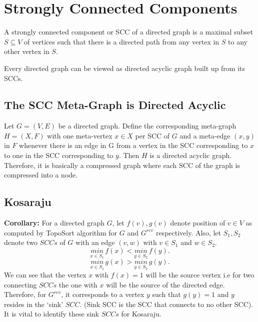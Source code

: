 \documentclass{article}
\begin{document}
	\section{Strongly Connected Components}
	A strongly connected component or SCC of a directed graph is a maximal subset $S \subseteq V$ of vertices such that there is a directed path from any vertex in $S$ to any other vertex in $S$.
	
	Every directed graph can be viewed as directed acyclic graph built up from its SCCs.
	
	\subsection*{The SCC Meta-Graph is Directed Acyclic}
	Let $G = (V,E)$ be a directed graph. Define the corresponding meta-graph $H = (X,F)$ with one meta-vertex  $x \in X$ per SCC of $G$ and a meta-edge $(x,y)$ in $F$ whenever there is an edge in G from a vertex in the SCC corresponding to $x$ to one in the SCC corresponding to $y$. Then $H$ is a directed acyclic graph.  \\[0.3mm]
	
	Therefore, it is basically a compressed graph where each SCC of the graph is compressed into a node.
	
	\subsection{Kosaraju}
	\textbf{Corollary:} For a directed graph $G$, let $f(v), g(v)$ denote position of $v \in V$ as computed by TopoSort algorithm for $G$ and $G^{rev}$ respectively. Also, let $S_1,S_2$ denote two $SCCs$ of $G$ with an edge $(v,w)$ with $v \in S_1$ and $w \in S_2$.
	\[
	\underset{x \in S_1}{min} \, f(x) < \underset{y \in S_2}{min} \, f(y).
	\]
	\[
	\underset{x \in S_1}{min} \, g(x) > \underset{y \in S_2}{min} \, g(y).
	\]
	We can see that the vertex $x$ with $f(x) = 1$ will be the source vertex i.e for two connecting $SCCs$ the one with $x$ will be the source of the directed edge. Therefore, for $G^{rev}$, it corresponds to a vertex $y$ such that $g(y) = 1$ and $y$ resides in the `sink' $SCC$. (Sink SCC is the SCC that connects to no other SCC). It is vital to identify these sink $SCCs$ for Kosaraju.
	
	\vspace{5mm}
	
\end{document}
